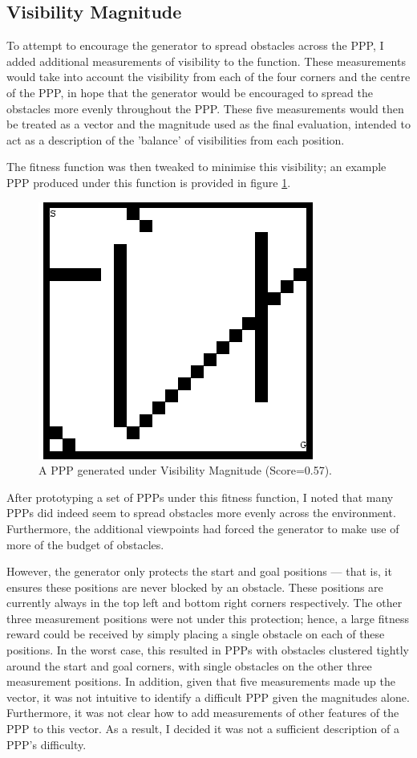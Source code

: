 \documentclass[authoryearcitations]{UoYCSproject}
\begin{document}
\subsection{Visibility Magnitude}
\label{sec:visMag}
To attempt to encourage the generator to spread obstacles across the PPP, I added additional measurements of visibility to the function. These measurements would take into account the visibility from each of the four corners and the centre of the PPP, in hope that the generator would be encouraged to spread the obstacles more evenly throughout the PPP. These five measurements would then be treated as a vector and the magnitude used as the final evaluation, intended to act as a description of the 'balance' of visibilities from each position.

The fitness function was then tweaked to minimise this visibility; an example PPP produced under this function is provided in figure \ref{fig:vis_mag_ppp}.

\begin{figure}
\graphicspath{ {DesignImpPics/} }
\includegraphics[scale=0.65]{visMag.png}
\caption{A PPP generated under Visibility Magnitude (Score=0.57).}
\label{fig:vis_mag_ppp}
\end{figure}

After prototyping a set of PPPs under this fitness function, I noted that many PPPs did indeed seem to spread obstacles more evenly across the environment. Furthermore, the additional viewpoints had forced the generator to make use of more of the budget of obstacles. 

However, the generator only protects the start and goal positions --- that is, it ensures these positions are never blocked by an obstacle. These positions are currently always in the top left and bottom right corners respectively. The other three measurement positions were not under this protection; hence, a large fitness reward could be received by simply placing a single obstacle on each of these positions. In the worst case, this resulted in PPPs with obstacles clustered tightly around the start and goal corners, with single obstacles on the other three measurement positions. In addition, given that five measurements made up the vector, it was not intuitive to identify a difficult PPP given the magnitudes alone. Furthermore, it was not clear how to add measurements of other features of the PPP to this vector. As a result, I decided it was not a sufficient description of a PPP's difficulty.
\end{document}
